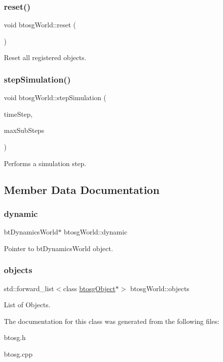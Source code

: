 \subsubsection{\texorpdfstring{reset()}{reset()}}
{\footnotesize\ttfamily void btosg\+World\+::reset (\begin{DoxyParamCaption}{ }\end{DoxyParamCaption})}

Reset all registered objects. \mbox{\label{classbtosgWorld_afce096686d8f84afd8b8fa3f2dc161b8}} 
\subsubsection{\texorpdfstring{stepSimulation()}{stepSimulation()}}
{\footnotesize\ttfamily void btosg\+World\+::step\+Simulation (\begin{DoxyParamCaption}\item[{bt\+Scalar}]{time\+Step,  }\item[{int}]{max\+Sub\+Steps }\end{DoxyParamCaption})}

Performs a simulation step. 

\subsection{Member Data Documentation}
\mbox{\label{classbtosgWorld_ad757a7b3b845142f200d1f2127e5372e}} 
\subsubsection{\texorpdfstring{dynamic}{dynamic}}
{\footnotesize\ttfamily bt\+Dynamics\+World$\ast$ btosg\+World\+::dynamic}



Pointer to bt\+Dynamics\+World object. 

\mbox{\label{classbtosgWorld_ab105aa8c0f8bdbdf323d47b902f6aca0}} 
\subsubsection{\texorpdfstring{objects}{objects}}
{\footnotesize\ttfamily std\+::forward\+\_\+list$<$class \mbox{\hyperlink{classbtosgObject}{btosg\+Object}}$\ast$$>$ btosg\+World\+::objects}



List of Objects. 



The documentation for this class was generated from the following files\+:\begin{DoxyCompactItemize}
\item 
btosg.\+h\item 
btosg.\+cpp\end{DoxyCompactItemize}
